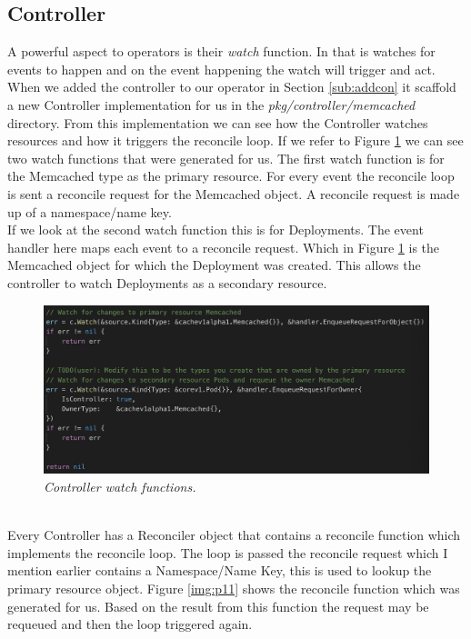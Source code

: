 \subsection{Controller}
\label{sub:controller}
A powerful aspect to operators is their \textit{watch} function. In that is watches for events to happen and on the event happening the watch will trigger and act. 
\\When we added the controller to our operator in Section \ref{sub:addcon} it scaffold a new Controller implementation for us in the \textit{pkg/controller/memcached} directory. From this implementation we can see how the Controller watches resources and how it triggers the reconcile loop.
If we refer to Figure \ref{img:p10} we can see two watch functions that were generated for us. The first watch function is for the Memcached type as the primary resource. For every event the reconcile loop is sent a reconcile request for the Memcached object. A reconcile request is made up of a namespace/name key.
\\If we look at the second watch function this is for Deployments. The event handler here maps each event to a reconcile request. Which in Figure \ref{img:p10} is the Memcached object for which the Deployment was created. This allows the controller to watch Deployments as a secondary resource.
\begin{figure}[!hb]
\centering
\includegraphics*[width=1\textwidth]{images/p10.png}
\caption{\em Controller watch functions.}
\label{img:p10}
\end{figure}
\\Every Controller has a Reconciler object that contains a reconcile function which implements the reconcile loop. The loop is passed the reconcile request which I mention earlier contains a Namespace/Name Key, this is used to lookup the primary resource object. Figure \ref{img:p11} shows the reconcile function which was generated for us. Based on the result from this function the request may be requeued and then the loop triggered again.

